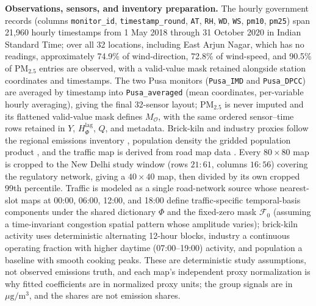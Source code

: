 \noindent\textbf{Observations, sensors, and inventory preparation.}
The hourly government records \citep{cpcb,cpcb_portal} (columns
\texttt{monitor\_id}, \texttt{timestamp\_round}, \texttt{AT}, \texttt{RH},
\texttt{WD}, \texttt{WS}, \texttt{pm10}, \texttt{pm25}) span 21,960 hourly
timestamps from 1 May 2018 through 31 October 2020 in Indian Standard Time;
over all 32 locations, including East Arjun Nagar, which has no readings,
approximately 74.9\% of wind-direction, 72.8\% of wind-speed, and 90.5\% of
PM\(_{2.5}\) entries are observed, with a valid-value mask retained alongside
station coordinates and timestamps.  The two Pusa monitors (\texttt{Pusa\_IMD} and
\texttt{Pusa\_DPCC}) are averaged by timestamp into \texttt{Pusa\_averaged} (mean
coordinates, per-variable hourly averaging), giving the final 32-sensor layout;
PM\(_{2.5}\) is never imputed and its flattened valid-value mask defines
\(M_{\mathcal O}\), with the same ordered sensor--time rows retained in \(Y\),
\(H_\Phi^{\mathrm{lag}}\), \(Q\), and metadata.  Brick-kiln and industry proxies
follow the regional emissions inventory \citep{GUTTIKUNDA2013101}, population
density the gridded population product \citep{ColumbiaUniversity2018}, and the
traffic map is derived from road map data \citep{google_maps}.  Every
\(80\times80\) map is cropped to the New Delhi study window (rows \(21{:}61\),
columns \(16{:}56\)) covering the regulatory network, giving a \(40\times40\) map,
then divided by its own cropped 99th percentile.  Traffic is modeled as a single
road-network source whose nearest-slot maps at 00:00, 06:00, 12:00, and 18:00
define traffic-specific temporal-basis components under the shared dictionary
\(\Phi\) and the fixed-zero mask \(\mathcal F_0\) (assuming a time-invariant
congestion spatial pattern whose amplitude varies); brick-kiln activity uses
deterministic alternating 12-hour blocks, industry a continuous operating fraction
with higher daytime (07:00--19:00) activity, and population a baseline with smooth
cooking peaks.  These are deterministic study assumptions, not observed emissions
truth, and each map's independent proxy normalization is why fitted coefficients
are in normalized proxy units; the group signals are in \(\mu\mathrm g/\mathrm m^3\),
and the shares are not emission shares.

